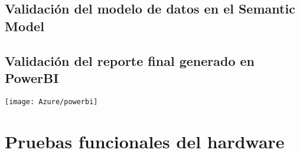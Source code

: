 \subsection{Validación del modelo de datos en el Semantic Model}

\subsection{Validación del reporte final generado en PowerBI}

\begin{center}
   \texttt{[image: Azure/powerbi]}
   \label{fig:powerbi1}
\end{center}
 

\section{Pruebas funcionales del hardware}
